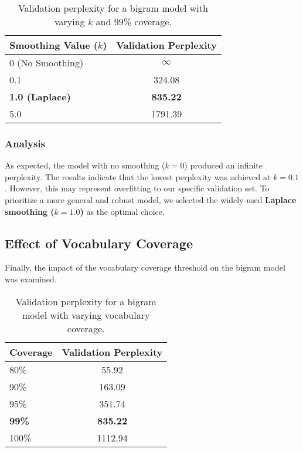 \documentclass[a4paper]{article}
\begin{document}
\begin{table}[h!]
  \centering
  \begin{tabular}{|l|c|}
    \hline
    \textbf{Smoothing Value ($k$)} & \textbf{Validation Perplexity} \\
    \hline
    0 (No Smoothing)               & $\infty$                       \\
    0.1                            & 324.08                         \\
    \textbf{1.0 (Laplace)}         & \textbf{835.22}                \\
    5.0                            & 1791.39                        \\
    \hline
  \end{tabular}
  \caption{Validation perplexity for a bigram model with varying $k$ and 99\% coverage.}
  \label{tab:smoothing_perplexity}
\end{table}

\subsubsection{Analysis}
As expected, the model with no smoothing ($k=0$) produced an infinite perplexity. The results indicate that the lowest perplexity was achieved at $k=0.1$. However, this may represent overfitting to our specific validation set. To prioritize a more general and robust model, we selected the widely-used \textbf{Laplace smoothing ($k=1.0$)} as the optimal choice.

\subsection{Effect of Vocabulary Coverage}
Finally, the impact of the vocabulary coverage threshold on the bigram model was examined.

\begin{table}[h!]
  \centering
  \begin{tabular}{|l|c|}
    \hline
    \textbf{Coverage} & \textbf{Validation Perplexity} \\
    \hline
    80\%              & 55.92                          \\
    90\%              & 163.09                         \\
    95\%              & 351.74                         \\
    \textbf{99\%}     & \textbf{835.22}                \\
    100\%             & 1112.94                        \\
    \hline
  \end{tabular}
  \caption{Validation perplexity for a bigram model with varying vocabulary coverage.}
  \label{tab:coverage_perplexity}
\end{table}
\end{document}
